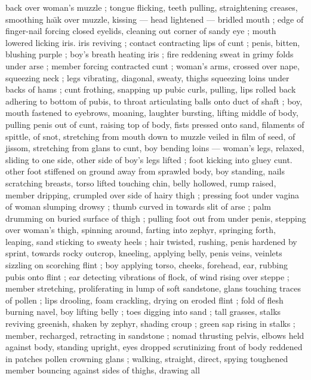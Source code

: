 back over woman's muzzle ; tongue flicking, teeth pulling, 
straightening creases, smoothing ha\"{\i}k over muzzle, kissing --- head 
lightened --- bridled mouth ; edge of finger-nail forcing closed 
eyelids, cleaning out corner of sandy eye ; mouth lowered licking iris. 
iris reviving ; contact contracting lips of cunt ; penis, bitten, blushing 
purple ; boy's breath heating iris ; fire reddening sweat in grimy folds 
under arse ; member forcing contracted cunt ; woman's arms, 
crossed over nape, squeezing neck ; legs vibrating, diagonal, sweaty, 
thighs squeezing loins under backs of hams ; cunt frothing, snapping 
up pubic curls, pulling, lips rolled back adhering to bottom of pubis, 
to throat articulating balls onto duct of shaft ; boy, mouth fastened 
to eyebrows, moaning, laughter bursting, lifting middle of body, 
pulling penis out of cunt, raising top of body, fists pressed onto 
sand, filaments of spittle, of snot, stretching from mouth down to 
muzzle veiled in film of seed, of jissom, stretching from glans to 
cunt, boy bending loins --- woman's legs, relaxed, sliding to one 
side, other side of boy's legs lifted ; foot kicking into gluey cunt. 
other foot stiffened on ground away from sprawled body, boy 
standing, nails scratching breasts, torso lifted touching chin, belly 
hollowed, rump raised, member dripping, crumpled over side of 
hairy thigh ; pressing foot under vagina of woman slumping drowsy 
; thumb curved in towards slit of arse ; palm drumming on buried 
surface of thigh ; pulling foot out from under penis, stepping over 
woman's thigh, spinning around, farting into zephyr, springing forth, 
leaping, sand sticking to sweaty heels ; hair twisted, rushing, penis 
hardened by sprint, towards rocky outcrop, kneeling, applying belly, 
penis {\col} veins, veinlets sizzling on scorching flint ; boy applying torso, 
cheeks, forehead, ear, rubbing pubis onto flint ; ear detecting 
vibrations of flock, of wind rising over steppe ; member stretching, 
proliferating in lump of soft sandstone, glans touching traces of 
pollen ; lips drooling, foam crackling, drying on eroded flint ; fold of 
flesh burning navel, boy lifting belly ; toes digging into sand ; tall 
grasses, stalks reviving greenish, shaken by zephyr, shading croup ; 
green sap rising in stalks ; member, recharged, retracting in 
sandstone ; nomad thrusting pelvis, elbows held against body, 
standing upright, eyes dropped scrutinizing front of body reddened 
in patches {\col} pollen crowning glans ; walking, straight, direct, spying 
toughened member bouncing against sides of thighs, drawing all 
